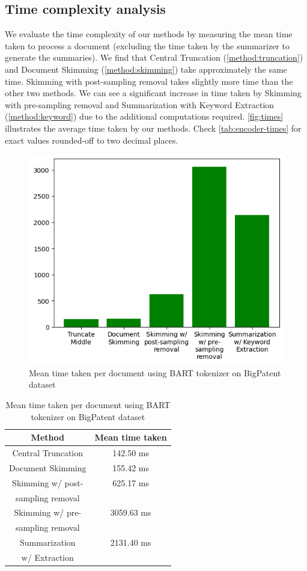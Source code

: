 \subsection*{Time complexity analysis}

We evaluate the time complexity of our methods by measuring the mean time taken to process
a document (excluding the time taken by the summarizer to generate the summaries).
We find that Central Truncation (\ref{method:truncation}) and Document Skimming
(\ref{method:skimming}) take approximately the same time.
Skimming with post-sampling removal takes slightly more time than the other two methods.
We can see a significant increase in time taken by Skimming with pre-sampling removal
and Summarization with Keyword Extraction (\ref{method:keyword}) due to the additional
computations required.
\autoref{fig:times} illustrates the average time taken by our methods.
Check \autoref{tab:encoder-times} for exact values rounded-off to two decimal places.

\begin{figure}[!ht]
	\centering
	\includegraphics[width=.48\textwidth]{Images/encoder-times.png}
	\caption{Mean time taken per document using BART tokenizer on BigPatent dataset}
	\label{fig:times}
\end{figure}

\begin{table}[!ht]
	\centering

	\begin{tabular}{c c}
		\hline
		Method & Mean time taken \\
		\hline
		Central Truncation & 142.50 ms \\
		Document Skimming & 155.42 ms \\
		Skimming w/ post- & 625.17 ms \\
		sampling removal & \\
		Skimming w/ pre- & 3059.63 ms \\
		sampling removal & \\
		Summarization & 2131.40 ms \\
		w/ Extraction & \\
		\hline
	\end{tabular}

	\caption{Mean time taken per document using BART tokenizer on BigPatent dataset}
	\label{tab:encoder-times}
\end{table}
